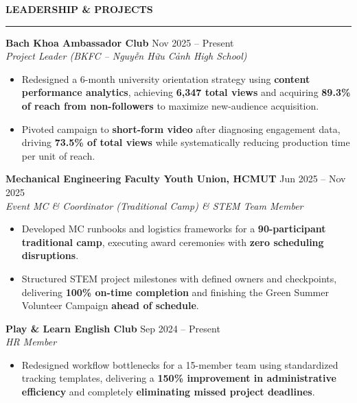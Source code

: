 \documentclass[10pt,a4paper]{article}
\newcommand{\sectionrule}[1]{%
  {\large\textbf{#1}}\\[-4pt]
  {\rule{\linewidth}{0.8pt}}
}
\begin{document}
\sectionrule{LEADERSHIP \& PROJECTS}
\textbf{Bach Khoa Ambassador Club} \hfill {\small Nov 2025 -- Present}\\
{\small \textit{Project Leader (BKFC -- Nguyễn Hữu Cảnh High School)}}
\begin{itemize}[topsep=2pt]
  \item {\small Redesigned a 6-month university orientation strategy using \textbf{content performance analytics}, achieving \textbf{6{,}347 total views} and acquiring \textbf{89.3\% of reach from non-followers} to maximize new-audience acquisition.}
  \item {\small Pivoted campaign to \textbf{short-form video} after diagnosing engagement data, driving \textbf{73.5\% of total views} while systematically reducing production time per unit of reach.}
\end{itemize}

\vspace{5pt}

\textbf{Mechanical Engineering Faculty Youth Union, HCMUT} \hfill {\small Jun 2025 -- Nov 2025}\\
{\small \textit{Event MC \& Coordinator (Traditional Camp) \& STEM Team Member}}
\begin{itemize}[topsep=2pt]
  \item {\small Developed MC runbooks and logistics frameworks for a \textbf{90-participant traditional camp}, executing award ceremonies with \textbf{zero scheduling disruptions}.}
  \item {\small Structured STEM project milestones with defined owners and checkpoints, delivering \textbf{100\% on-time completion} and finishing the Green Summer Volunteer Campaign \textbf{ahead of schedule}.}
\end{itemize}

\vspace{5pt}

\textbf{Play \& Learn English Club} \hfill {\small Sep 2024 -- Present}\\
{\small \textit{HR Member}}
\begin{itemize}[topsep=2pt]
  \item {\small Redesigned workflow bottlenecks for a 15-member team using standardized tracking templates, delivering a \textbf{150\% improvement in administrative efficiency} and completely \textbf{eliminating missed project deadlines}.}
\end{itemize}
\end{document}
